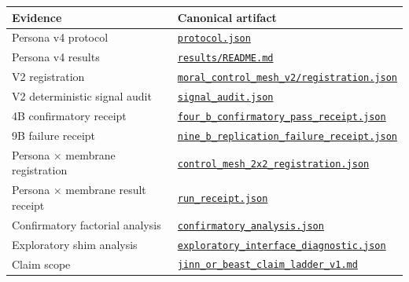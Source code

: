 \documentclass[
  11pt,
  letterpaper,
]{article}
\newcounter{none} %
\begin{document}
{\def\LTcaptype{none} %
\begin{longtable}[]{@{}
  >{\raggedright\arraybackslash}p{}
  >{\raggedright\arraybackslash}p{}@{}}
\toprule\noalign{}
\begin{minipage}[b]{\linewidth}\raggedright
Evidence
\end{minipage} & \begin{minipage}[b]{\linewidth}\raggedright
Canonical artifact
\end{minipage} \\
\midrule\noalign{}
\endhead
\bottomrule\noalign{}
\endlastfoot
Persona v4 protocol &
\href{../experiments/jinn_persona_ambivalence_v4_expanded/protocol.json}{\texttt{protocol.json}} \\
Persona v4 results &
\href{../experiments/jinn_persona_ambivalence_v4_expanded/results/README.md}{\texttt{results/README.md}} \\
V2 registration &
\href{../experiments/jinn_beast_metta_rl_v1/moral_control_mesh_v2/registration.json}{\texttt{moral\_control\_mesh\_v2/registration.json}} \\
V2 deterministic signal audit &
\href{../experiments/jinn_beast_metta_rl_v1/moral_control_mesh_v2/signal_audit.json}{\texttt{signal\_audit.json}} \\
4B confirmatory receipt &
\href{../experiments/jinn_beast_metta_rl_v1/moral_control_mesh_v2/four_b_confirmatory_pass_receipt.json}{\texttt{four\_b\_confirmatory\_pass\_receipt.json}} \\
9B failure receipt &
\href{../experiments/jinn_beast_metta_rl_v1/moral_control_mesh_v2/nine_b_replication_failure_receipt.json}{\texttt{nine\_b\_replication\_failure\_receipt.json}} \\
Persona × membrane registration &
\href{../experiments/jinn_persona_ambivalence_v4_expanded/control_mesh_2x2_registration.json}{\texttt{control\_mesh\_2x2\_registration.json}} \\
Persona × membrane result receipt &
\href{../experiments/jinn_persona_ambivalence_v4_expanded/control_mesh_2x2/results/run_receipt.json}{\texttt{run\_receipt.json}} \\
Confirmatory factorial analysis &
\href{../experiments/jinn_persona_ambivalence_v4_expanded/control_mesh_2x2/results/confirmatory_analysis.json}{\texttt{confirmatory\_analysis.json}} \\
Exploratory shim analysis &
\href{../experiments/jinn_persona_ambivalence_v4_expanded/control_mesh_2x2/results/exploratory_interface_diagnostic.json}{\texttt{exploratory\_interface\_diagnostic.json}} \\
Claim scope &
\href{jinn_or_beast_claim_ladder_v1.md}{\texttt{jinn\_or\_beast\_claim\_ladder\_v1.md}} \\
\end{longtable}
}
\end{document}
